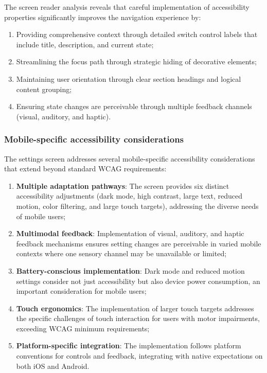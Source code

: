 The screen reader analysis reveals that careful implementation of accessibility properties significantly improves the navigation experience by:
\begin{enumerate}
    \item Providing comprehensive context through detailed switch control labels that include title, description, and current state;
    
    \item Streamlining the focus path through strategic hiding of decorative elements;
    
    \item Maintaining user orientation through clear section headings and logical content grouping;
    
    \item Ensuring state changes are perceivable through multiple feedback channels (visual, auditory, and haptic).
\end{enumerate}

\subsubsection{Mobile-specific accessibility considerations}
\label{subsubsec:settings-mobile-specific-summary}

The settings screen addresses several mobile-specific accessibility considerations that extend beyond standard WCAG requirements:

\begin{enumerate}
    \item \textbf{Multiple adaptation pathways}: The screen provides six distinct accessibility adjustments (dark mode, high contrast, large text, reduced motion, color filtering, and large touch targets), addressing the diverse needs of mobile users;
    
    \item \textbf{Multimodal feedback}: Implementation of visual, auditory, and haptic feedback mechanisms ensures setting changes are perceivable in varied mobile contexts where one sensory channel may be unavailable or limited;
    
    \item \textbf{Battery-conscious implementation}: Dark mode and reduced motion settings consider not just accessibility but also device power consumption, an important consideration for mobile users;
    
    \item \textbf{Touch ergonomics}: The implementation of larger touch targets addresses the specific challenges of touch interaction for users with motor impairments, exceeding WCAG minimum requirements;
    
    \item \textbf{Platform-specific integration}: The implementation follows platform conventions for controls and feedback, integrating with native expectations on both iOS and Android.
\end{enumerate}

